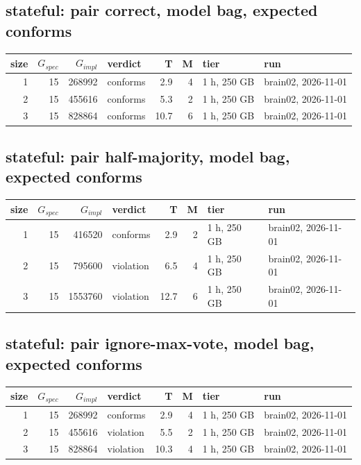 \documentclass[10pt]{article}
\begin{document}
\subsection*{stateful: pair \textsf{correct}, model bag, expected conforms}
\begin{longtable}{@{}rrrlrrll@{}}
\toprule
size & $G_{\mathit{spec}}$ & $G_{\mathit{impl}}$ & verdict & T & M & tier & run \\
\midrule
\endhead
\color{blue} 1 & 15 & 268992 & conforms & 2.9 & 4 & 1 h, 250 GB & brain02, 2026-11-01 \\
\color{blue} 2 & 15 & 455616 & conforms & 5.3 & 2 & 1 h, 250 GB & brain02, 2026-11-01 \\
\color{blue} 3 & 15 & 828864 & conforms & 10.7 & 6 & 1 h, 250 GB & brain02, 2026-11-01 \\
\bottomrule
\end{longtable}
\subsection*{stateful: pair \textsf{half-majority}, model bag, expected conforms}
\begin{longtable}{@{}rrrlrrll@{}}
\toprule
size & $G_{\mathit{spec}}$ & $G_{\mathit{impl}}$ & verdict & T & M & tier & run \\
\midrule
\endhead
\color{blue} 1 & 15 & 416520 & conforms & 2.9 & 2 & 1 h, 250 GB & brain02, 2026-11-01 \\
\color{blue} 2 & 15 & 795600 & violation & 6.5 & 4 & 1 h, 250 GB & brain02, 2026-11-01 \\
\color{blue} 3 & 15 & 1553760 & violation & 12.7 & 6 & 1 h, 250 GB & brain02, 2026-11-01 \\
\bottomrule
\end{longtable}
\subsection*{stateful: pair \textsf{ignore-max-vote}, model bag, expected conforms}
\begin{longtable}{@{}rrrlrrll@{}}
\toprule
size & $G_{\mathit{spec}}$ & $G_{\mathit{impl}}$ & verdict & T & M & tier & run \\
\midrule
\endhead
\color{blue} 1 & 15 & 268992 & conforms & 2.9 & 4 & 1 h, 250 GB & brain02, 2026-11-01 \\
\color{blue} 2 & 15 & 455616 & violation & 5.5 & 2 & 1 h, 250 GB & brain02, 2026-11-01 \\
\color{blue} 3 & 15 & 828864 & violation & 10.3 & 4 & 1 h, 250 GB & brain02, 2026-11-01 \\
\bottomrule
\end{longtable}
\end{document}
